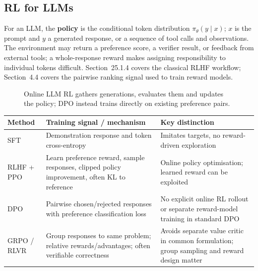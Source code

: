 \subsection{RL for LLMs}\label{sec:rl-llms}
For an LLM, the \textbf{policy} is the conditional token distribution $\pi_{\theta}(y\mid x)$; $x$ is the prompt and $y$ a generated response, or a sequence of tool calls and observations.
The environment may return a preference score, a verifier result, or feedback from external tools; a whole-response reward makes assigning responsibility to individual tokens difficult.
Section~25.1.4 covers the classical RLHF workflow; Section~4.4 covers the pairwise ranking signal used to train reward models.

\begin{figure}[!htbp]\centering
{}
\caption{Online LLM RL gathers generations, evaluates them and updates the policy; DPO instead trains directly on existing preference pairs.}
\end{figure}
\begin{center}\begingroup\footnotesize\setlength{\tabcolsep}{3pt}
\begin{tabular}{|p{.18\linewidth}|p{.39\linewidth}|p{.34\linewidth}|}\hline
\textbf{Method} & \textbf{Training signal / mechanism} & \textbf{Key distinction}\\ \hline
SFT & Demonstration response and token cross-entropy & Imitates targets, no reward-driven exploration\\ \hline
RLHF + PPO & Learn preference reward, sample responses, clipped policy improvement, often KL to reference & Online policy optimisation; learned reward can be exploited\\ \hline
DPO & Pairwise chosen/rejected responses with preference classification loss & No explicit online RL rollout or separate reward-model training in standard DPO\\ \hline
GRPO / RLVR & Group responses to same problem; relative rewards/advantages; often verifiable correctness & Avoids separate value critic in common formulation; group sampling and reward design matter\\ \hline
\end{tabular}\endgroup\end{center}

